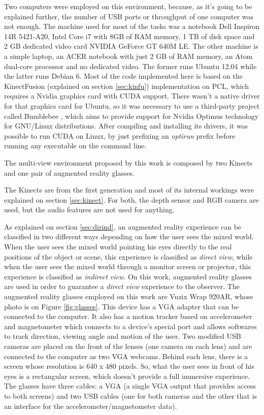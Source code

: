 \documentclass[msc, a4paper, classic, en]{ufbathesis}
\begin{document}
Two computers were employed on this environment, because, as it's going to be explained further, the number of USB ports or throughput of one computer was not enough. The machine used for most of the tasks was a notebook Dell Inspiron 14R 5421-A20, Intel Core i7 with 8GB of RAM memory, 1 TB of disk space and 2 GB dedicated video card NVIDIA GeForce GT 640M LE. The other machine is a simple laptop, an ACER notebook with just 2 GB of RAM memory, an Atom dual-core processor and no dedicated video. The former runs Ubuntu 12.04 while the latter runs Debian 6. Most of the code implemented here is based on the KinectFusion (explained on section \ref{sec:kinfu}) implementation on PCL, which requires a Nvidia graphics card with CUDA support. There wasn't a native driver for that graphics card for Ubuntu, so it was necessary to use a third-party project called Bumblebee \cite{bumblebee}, which aims to provide support for Nvidia Optimus technology for GNU/Linux distributions. After compiling and installing its drivers, it was possible to run CUDA on Linux, by just prefixing an \textit{optirun} prefix before running any executable on the command line.

The multi-view environment proposed by this work is composed by two Kinects and one pair of augmented reality glasses.

The Kinects are from the first generation and most of its internal workings were explained on section \ref{sec:kinect}. For both, the depth sensor and RGB camera are used, but the audio features are not used for anything.

As explained on section \ref{sec:dirind}, an augmented reality experience can be classified in two different ways depending on how the user sees the mixed world. When the user sees the mixed world pointing his eyes directly to the real positions of the object or scene, this experience is classified as \textit{direct view}, while when the user sees the mixed world through a monitor screen or projector, this experience is classified as \textit{indirect view}. On this work, augmented reality glasses are used in order to guarantee a \textit{direct view} experience to the observer. The augmented reality glasses employed on this work are Vuzix Wrap 920AR, whose photo is on Figure \ref{fig:glasses}. This device has a VGA adapter that can be connected to the computer. It also has a motion tracker based on accelerometer and magnetometer which connects to a device's special port and allows softwares to track direction, viewing angle and motion of the user. Two modified USB cameras are placed on the front of the lenses (one camera on each lens) and are connected to the computer as two VGA webcams. Behind each lens, there is a screen whose resolution is 640 x 480 pixels. So, what the user sees in front of his eyes is a rectangular screen, which doesn't provide a full immersive experience. The glasses have three cables: a VGA (a single VGA output that provides access to both screens) and two USB cables (one for both cameras and the other that is an interface for the accelerometer/magnetometer data).
\end{document}
